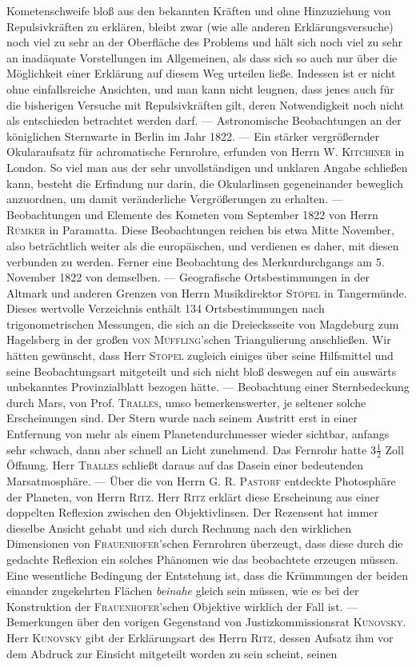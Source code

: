 Kometenschweife bloß aus den bekannten Kräften und ohne Hinzuziehung von Repulsivkräften zu erklären, bleibt zwar (wie alle anderen Erklärungsversuche) noch viel zu sehr an der Oberfläche des Problems und hält sich noch viel zu sehr an inadäquate Vorstellungen im Allgemeinen, als dass sich so auch nur über die Möglichkeit einer Erklärung auf diesem Weg urteilen ließe. Indessen ist er nicht ohne einfallsreiche Ansichten, und man kann nicht leugnen, dass jenes auch für die bisherigen Versuche mit Repulsivkräften gilt, deren Notwendigkeit noch nicht als entschieden betrachtet werden darf. --- Astronomische Beobachtungen an der königlichen Sternwarte in Berlin im Jahr 1822. --- Ein stärker vergrößernder Okularaufsatz für achromatische Fernrohre, erfunden von Herrn W. \textsc{Kitchiner} in London. So viel man aus der sehr unvollständigen und unklaren Angabe schließen kann, besteht die Erfindung nur darin, die Okularlinsen gegeneinander beweglich anzuordnen, um damit veränderliche Vergrößerungen zu erhalten. --- Beobachtungen und Elemente des Kometen vom September 1822 von Herrn \textsc{Rümker} in Paramatta. Diese Beobachtungen reichen bis etwa Mitte November, also beträchtlich weiter als die europäischen, und verdienen es daher, mit diesen verbunden zu werden. Ferner eine Beobachtung des Merkurdurchgangs am 5. November 1822 von demselben. --- Geografische Ortsbestimmungen in der Altmark und anderen Grenzen von Herrn Musikdirektor \textsc{Stöpel} in Tangermünde. Dieses wertvolle Verzeichnis enthält 134 Ortsbestimmungen nach trigonometrischen Messungen, die sich an die Dreiecksseite von Magdeburg zum Hagelsberg in der großen \textsc{von Müffling}'schen Triangulierung anschließen. Wir hätten gewünscht, dass Herr \textsc{Stöpel} zugleich einiges über seine Hilfsmittel und seine  Beobachtungsart mitgeteilt und sich nicht bloß deswegen auf ein auswärts unbekanntes Provinzialblatt bezogen hätte. --- Beobachtung einer Sternbedeckung durch Mars, von Prof. \textsc{Tralles}, umso bemerkenswerter, je seltener solche Erscheinungen sind. Der Stern wurde nach seinem Austritt erst in einer Entfernung von mehr als einem Planetendurchmesser wieder sichtbar, anfangs sehr schwach, dann aber schnell an Licht zunehmend. Das Fernrohr hatte $3\tfrac{1}{2}$ Zoll Öffnung. Herr \textsc{Tralles} schließt daraus auf das Dasein einer bedeutenden Marsatmosphäre. --- Über die von Herrn G. R. \textsc{Pastorf} entdeckte Photosphäre der Planeten, von Herrn \textsc{Ritz}. Herr \textsc{Ritz} erklärt diese Erscheinung aus einer doppelten Reflexion zwischen den Objektivlinsen. Der Rezensent hat immer dieselbe Ansicht gehabt und sich durch Rechnung nach den wirklichen Dimensionen von \textsc{Frauenhofer}'schen Fernrohren überzeugt, dass diese durch die gedachte Reflexion ein solches Phänomen wie das beobachtete erzeugen müssen. Eine wesentliche Bedingung der Entstehung ist, dass die Krümmungen der beiden einander zugekehrten Flächen \emph{beinahe} gleich sein müssen, wie es bei der Konstruktion der \textsc{Frauenhofer}'schen Objektive wirklich der Fall ist. --- Bemerkungen über den vorigen Gegenstand von Justizkommissionsrat \textsc{Kunovsky}. Herr \textsc{Kunovsky} gibt der Erklärungsart des Herrn \textsc{Ritz}, dessen Aufsatz ihm vor dem Abdruck zur Einsicht mitgeteilt worden zu sein scheint, seinen 
